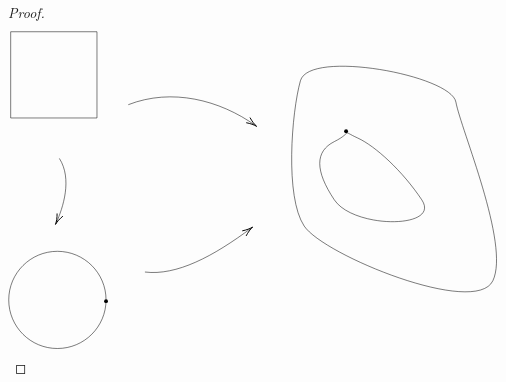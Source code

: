 \documentclass{article}
\begin{document}
\begin{proof}
\[\begin{tikzpicture}[x=0.75pt,y=0.75pt,yscale=-1,xscale=1]
\draw   (77,45.75) -- (165.8,45.75) -- (165.8,134.56) -- (77,134.56) -- cycle ;
\draw    (127.11,176.22) .. controls (140.62,197.45) and (130.85,227.06) .. (123.86,242.59) ;
\draw [shift={(123.11,244.22)}, rotate = 295.02] [color={rgb, 255:red, 0; green, 0; blue, 0 }  ][line width=0.75]    (10.93,-3.29) .. controls (6.95,-1.4) and (3.31,-0.3) .. (0,0) .. controls (3.31,0.3) and (6.95,1.4) .. (10.93,3.29)   ;
\draw   (75,321.94) .. controls (75,294.3) and (97.41,271.89) .. (125.06,271.89) .. controls (152.7,271.89) and (175.11,294.3) .. (175.11,321.94) .. controls (175.11,349.59) and (152.7,372) .. (125.06,372) .. controls (97.41,372) and (75,349.59) .. (75,321.94) -- cycle ;
\draw  [line width=3] [line join = round][line cap = round] (175.11,323.22) .. controls (175.11,323.22) and (175.11,323.22) .. (175.11,323.22) ;
\draw   (375.11,96.22) .. controls (384.22,63.56) and (530.22,90.56) .. (535.11,118.22) .. controls (540,145.89) and (591,264.89) .. (573.11,302.22) .. controls (555.22,339.56) and (399,275.89) .. (379,245.89) .. controls (359,215.89) and (366,128.89) .. (375.11,96.22) -- cycle ;
\draw   (410,158.89) .. controls (430,148.89) and (416,146.89) .. (434.11,155.22) .. controls (452.22,163.56) and (480,188.89) .. (500,218.89) .. controls (520,248.89) and (430,248.89) .. (410,218.89) .. controls (390,188.89) and (390,168.89) .. (410,158.89) -- cycle ;
\draw  [line width=3] [line join = round][line cap = round] (422.11,148.22) .. controls (422.11,148.22) and (422.11,148.22) .. (422.11,148.22) ;
\draw    (198,120.89) .. controls (242.66,103.4) and (292.11,115.97) .. (329,142.42) ;
\draw [shift={(330.11,143.22)}, rotate = 216.12] [color={rgb, 255:red, 0; green, 0; blue, 0 }  ][line width=0.75]    (10.93,-3.29) .. controls (6.95,-1.4) and (3.31,-0.3) .. (0,0) .. controls (3.31,0.3) and (6.95,1.4) .. (10.93,3.29)   ;
\draw    (215.11,293.22) .. controls (247.78,297.18) and (285.24,277.29) .. (324.8,247.79) ;
\draw [shift={(326,246.89)}, rotate = 143.13] [color={rgb, 255:red, 0; green, 0; blue, 0 }  ][line width=0.75]    (10.93,-3.29) .. controls (6.95,-1.4) and (3.31,-0.3) .. (0,0) .. controls (3.31,0.3) and (6.95,1.4) .. (10.93,3.29)   ;

\end{tikzpicture}\]
\end{proof}
\end{document}

